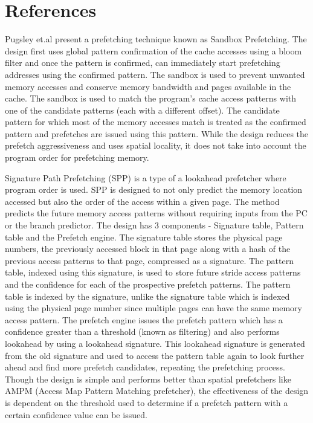 \documentclass[conference]{IEEEtran}
\begin{document}
\section{References}

Pugsley et.al present a prefetching technique known as Sandbox Prefetching\cite{sandbox}. The design first uses global pattern confirmation of the cache accesses using a bloom filter and once the pattern is confirmed, can immediately start prefetching addresses using the confirmed pattern. The sandbox is used to prevent unwanted memory accesses and conserve memory bandwidth and pages available in the cache. The sandbox is used to match the program’s cache access patterns with one of the candidate patterns (each with a different offset). The candidate pattern for which most of the memory accesses match is treated as the confirmed pattern and prefetches are issued using this pattern. While the design reduces the prefetch aggressiveness and uses spatial locality, it does not take into account the program order for prefetching memory.

Signature Path Prefetching \cite{SPP} (SPP) is a type of a lookahead prefetcher where program order is used. SPP is designed to not only predict the memory location accessed but also the order of the access within a given page. The method predicts the future memory access patterns without requiring inputs from the PC or the branch predictor. The design has 3 components - Signature table, Pattern table and the Prefetch engine. The signature table stores the physical page numbers, the previously accessed block in that page along with a hash of the previous access patterns to that page, compressed as a signature. The pattern table, indexed using this signature, is used to store future stride access patterns and the confidence for each of the prospective prefetch patterns. The pattern table is indexed by the signature, unlike the signature table which is indexed using the physical page number since multiple pages can have the same memory access pattern. The prefetch engine issues the prefetch pattern which has a confidence greater than a threshold (known as filtering) and also performs lookahead by using a lookahead signature. This lookahead signature is generated from the old signature and used to access the pattern table again to look further ahead and find more prefetch candidates, repeating the prefetching process. Though the design is simple and performs better than spatial prefetchers like AMPM (Access Map Pattern Matching prefetcher), the effectiveness of the design is dependent on the threshold used to determine if a prefetch pattern with a certain confidence value can be issued.
\end{document}
